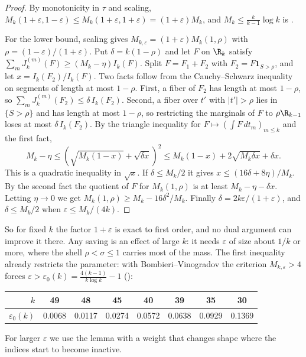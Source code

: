 \begin{proof}
By monotonicity in $\tau$ and scaling,
$M_k(1+\varepsilon,1-\varepsilon)\le M_k(1+\varepsilon,1+\varepsilon)=(1+\varepsilon)M_k$,
and $M_k\le\frac{k}{k-1}\log k$ is \cite[Cor.~6.4]{Pol14b}.

For the lower bound, scaling gives $M_{k,\varepsilon}=(1+\varepsilon)M_k(1,\rho)$
with $\rho=(1-\varepsilon)/(1+\varepsilon)$. Put $\delta=k(1-\rho)$ and let $F$
on $\R_k$ satisfy $\sum_mJ_k^{(m)}(F)\ge(M_k-\eta)I_k(F)$. Split $F=F_1+F_2$
with $F_2=F\mathbf 1_{S>\rho}$, and let $x=I_k(F_2)/I_k(F)$. Two facts follow
from the Cauchy--Schwarz inequality on segments of length at most $1-\rho$.
First, a fiber of $F_2$ has length at most $1-\rho$, so
$\sum_mJ_k^{(m)}(F_2)\le\delta\,I_k(F_2)$. Second, a fiber over $t'$ with
$|t'|>\rho$ lies in $\{S>\rho\}$ and has length at most $1-\rho$, so
restricting the marginals of $F$ to $\rho\R_{k-1}$ loses at most
$\delta\,I_k(F_2)$. By the triangle inequality for
$F\mapsto(\int F\,dt_m)_{m\le k}$ and the first fact,
\[
M_k-\eta\le\left(\sqrt{M_k(1-x)}+\sqrt{\delta x}\right)^2\le M_k(1-x)+2\sqrt{M_k\delta x}+\delta x .
\]
This is a quadratic inequality in $\sqrt x$. If $\delta\le M_k/2$ it gives
$x\le(16\delta+8\eta)/M_k$. By the second fact the quotient of $F$ for
$M_k(1,\rho)$ is at least $M_k-\eta-\delta x$. Letting $\eta\to0$ we get
$M_k(1,\rho)\ge M_k-16\delta^2/M_k$. Finally
$\delta=2k\varepsilon/(1+\varepsilon)$, and $\delta\le M_k/2$ when
$\varepsilon\le M_k/(4k)$.
\end{proof}

So for fixed $k$ the factor $1+\varepsilon$ is exact to first order, and no
dual argument can improve it there. Any saving is an effect of large $k$: it
needs $\varepsilon$ of size about $1/k$ or more, where the shell
$\rho<\sigma\le1$ carries most of the mass. The first inequality already
restricts the parameter: with Bombieri--Vinogradov the criterion
$M_{k,\varepsilon}>4$ forces
$\varepsilon>\varepsilon_0(k)=\frac{4(k-1)}{k\log k}-1$ ():
\begin{center}
\begin{tabular}{@{}rccccccc@{}}
\toprule
$k$ & 49 & 48 & 45 & 40 & 39 & 35 & 30\\
\midrule
$\varepsilon_0(k)$ & 0.0068 & 0.0117 & 0.0274 & 0.0572 & 0.0638 & 0.0929 & 0.1369\\
\bottomrule
\end{tabular}
\end{center}

For larger $\varepsilon$ we use the lemma with a weight that changes shape
where the indices start to become inactive.

